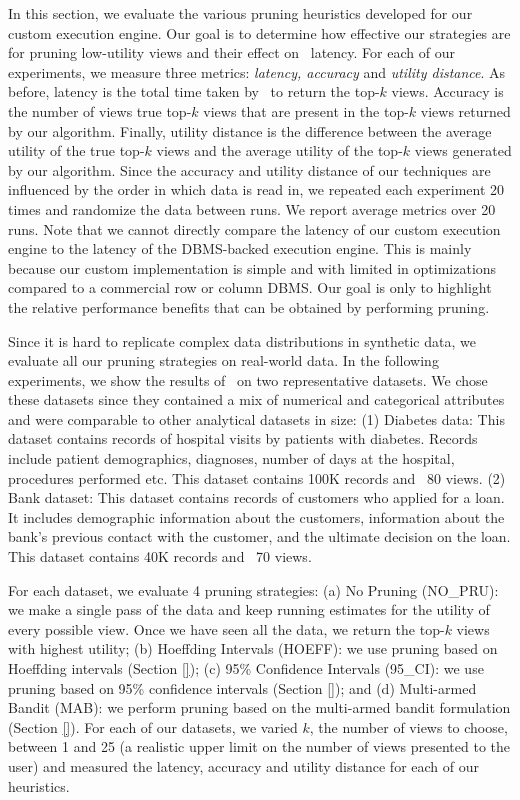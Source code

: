 In this section, we evaluate the various pruning heuristics developed for our
custom execution engine.
Our goal is to determine how effective our strategies are for pruning
low-utility views and their effect on \VizRecDB\ latency.
For each of our experiments, we measure three metrics: {\it latency, accuracy}
and {\it utility distance}.
As before, latency is the total time taken by \VizRecDB\ to return the top-$k$
views.
Accuracy is the number of views true top-$k$ views that are present in the
top-$k$ views returned by our algorithm.
Finally, utility distance is the difference between the average utility of
the true top-$k$ views and the average utility of the top-$k$ views generated by
our algorithm.
Since the accuracy and utility distance of our techniques are influenced by the
order in which data is read in, we repeated each experiment 20
times and randomize the data between runs. We report average
metrics over 20 runs.
Note that we cannot directly compare the latency
of our custom execution engine to the latency of the DBMS-backed execution
engine. This is mainly because our custom implementation is simple and with
limited in optimizations compared to a commercial row or column DBMS.
Our goal is only to highlight the relative performance benefits that can
be obtained by performing pruning.

Since it is hard to replicate complex data distributions in synthetic data, we
evaluate all our pruning strategies on real-world data. 
In the following
experiments, we show the results of \VizRecDB\ on two representative datasets.
We chose these datasets since they contained a mix of numerical and categorical
attributes and were comparable to other analytical datasets in size:
(1) Diabetes data\cite{}: This dataset contains records of hospital
visits by patients with diabetes. Records include patient demographics,
diagnoses, number of days at the hospital, procedures performed etc. 
This dataset contains 100K records and ~80 views.
(2) Bank dataset\cite{}: This dataset contains records of customers who
applied for a loan. It includes demographic information about the
customers, information about the bank's previous contact with the customer, and
the ultimate decision on the loan.
This dataset contains 40K records and ~70 views.

For each dataset, we evaluate 4 pruning strategies:
(a) No Pruning (NO\_PRU): we make a single pass of the data and keep running
estimates for the utility of every possible view. Once we have seen all the
data, we return the top-$k$ views with highest utility; (b) Hoeffding Intervals
(HOEFF):
we use pruning based on Hoeffding intervals (Section \ref{}); (c) 95\%
Confidence Intervals (95\_CI): we use pruning based on 95\% confidence intervals
(Section \ref{}); and (d) Multi-armed Bandit (MAB): we perform pruning based on
the multi-armed bandit formulation (Section \ref{}).
For each of our datasets, we varied $k$, the number of views to choose, between
1 and 25 (a realistic upper limit on the number of views presented to the user)
and measured the latency, accuracy and utility distance for each of our
heuristics.

